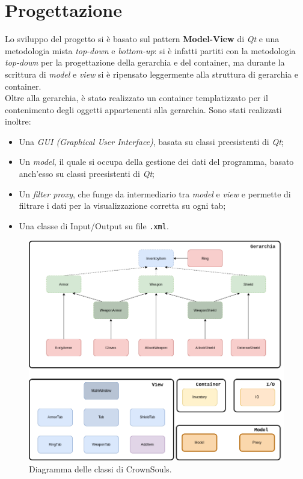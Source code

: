 \section{Progettazione}
Lo sviluppo del progetto si è basato sul pattern \textbf{Model-View} di \textit{Qt} e una metodologia mista \textit{top-down} e \textit{bottom-up}: si è infatti partiti con la metodologia \textit{top-down} per la progettazione della gerarchia e del container, ma durante la scrittura di \textit{model} e \textit{view} si è ripensato leggermente alla struttura di gerarchia e container. \\
Oltre alla gerarchia, è stato realizzato un container templatizzato per il contenimento degli oggetti appartenenti alla gerarchia.
Sono stati realizzati inoltre:
\begin{itemize}
  \item Una \textit{GUI (Graphical User Interface)}, basata su classi preesistenti di \textit{Qt};
  \item Un \textit{model}, il quale si occupa della gestione dei dati del programma, basato anch'esso su classi preesistenti di \textit{Qt};
  \item Un \textit{filter proxy}, che funge da intermediario tra \textit{model} e \textit{view} e permette di filtrare i dati per la visualizzazione corretta su ogni tab;
  \item Una classe di Input/Output su file \texttt{.xml}.
\end{itemize}

\begin{figure}[H]
  \centering
  \includegraphics[width = \linewidth]{img/diagramma}
  \caption{Diagramma delle classi di CrownSouls.}
\end{figure}

